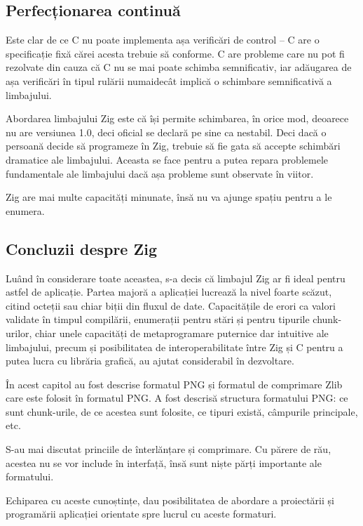 \documentclass[a4paper,12pt]{report}
\begin{document}
\subsection{Perfecționarea continuă}

Este clar de ce C nu poate implementa așa verificări de control --
C are o specificație fixă cărei acesta trebuie să conforme.
C are probleme care nu pot fi rezolvate din cauza că C nu se mai poate schimba semnificativ,
iar adăugarea de așa verificări în tipul rulării numaidecât implică
o schimbare semnificativă a limbajului.

Abordarea limbajului Zig este că își permite schimbarea,
în orice mod, deoarece nu are versiunea 1.0, deci oficial se declară pe sine ca nestabil.
Deci dacă o persoană decide să programeze în Zig,
trebuie să fie gata să accepte schimbări dramatice ale limbajului.
Aceasta se face pentru a putea repara problemele fundamentale
ale limbajului dacă așa probleme sunt observate în viitor.

Zig are mai multe capacități minunate, însă nu va ajunge spațiu pentru a le enumera.

\subsection{Concluzii despre Zig}

Luând în considerare toate aceastea, s-a decis că limbajul Zig ar fi ideal pentru astfel de aplicație.
Partea majoră a aplicației lucrează la nivel foarte scăzut,
citind octeții sau chiar biții din fluxul de date.
Capacitățile de erori ca valori validate în timpul compilării,
enumerații pentru stări și pentru tipurile chunk-urilor,
chiar unele capacități de metaprogramare puternice dar intuitive ale limbajului,
precum și posibilitatea de interoperabilitate între Zig și C pentru a putea lucra cu librăria grafică,
au ajutat considerabil în dezvoltare.


În acest capitol au fost descrise formatul \ac{PNG} și
formatul de comprimare Zlib care este folosit în formatul \ac{PNG}.
A fost descrisă structura formatului \ac{PNG}: ce sunt chunk-urile,
de ce acestea sunt folosite, ce tipuri există, câmpurile principale, etc.

S-au mai discutat princiile de înterlănțare și comprimare.
Cu părere de rău, acestea nu se vor include în interfață, însă sunt niște părți importante ale formatului.

Echiparea cu aceste cunoștințe,
dau posibilitatea de abordare a proiectării
și programării aplicației orientate spre lucrul cu aceste formaturi.
\end{document}
